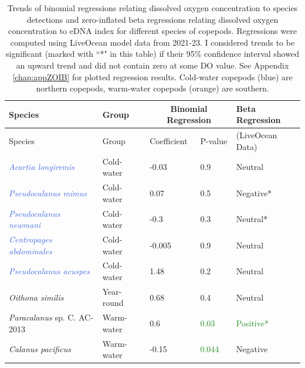 \documentclass[12pt,twoside]{reedthesis}
\begin{document}
	\begin{table}[!h] 
		\begin{tabular}{l | l | l l | l}
			\toprule
			Species & Group & \multicolumn{2}{|c|}{Binomial Regression} & Beta Regression \tabularnewline
			\midrule
			Species &  Group & Coefficient & P-value & (LiveOcean Data)  \\ 
			\midrule 
			\textcolor{RoyalBlue}{\textit{Acartia longiremis}}	& Cold-water & -0.03 & 0.9 & Neutral  \\
			\textcolor{RoyalBlue}{\textit{Pseudocalanus mimus}} & Cold-water & 0.07  & 0.5 & \textcolor{BrickRed}{Negative*}  \\
			\textcolor{RoyalBlue}{\textit{Pseudocalanus newmani}}	& Cold-water & -0.3  & 0.3 &  Neutral* \\
			\textcolor{RoyalBlue}{\textit{Centropages abdominales}} & Cold-water & -0.005 & 0.9 & Neutral   \\
			\textcolor{RoyalBlue}{\textit{Pseudocalanus acuspes}}  & Cold-water & 1.48  & 0.2 & Neutral  \\
			\textit{Oithona similis} & Year-round & 0.68  & 0.4 & Neutral \\
			\textcolor{RedOrange}{\textit{Paracalanus} sp. C. AC-2013} & Warm-water & 0.6  & \textcolor{ForestGreen}{0.03} & \textcolor{ForestGreen}{Positive*}  \\
			\textcolor{RedOrange}{\textit{Calanus pacificus}}	& Warm-water & -0.15  & \textcolor{ForestGreen}{0.044} & \textcolor{BrickRed}{Negative}  \\
			\bottomrule 
		\end{tabular}
		
		\caption[Regression results]{Trends of binomial regressions relating dissolved oxygen concentration to species detections and zero-inflated beta regressions relating dissolved oxygen concentration to eDNA index for different species of copepods. Regressions were computed using LiveOcean model data from 2021-23. I considered trends to be significant (marked with ``*" in this table) if their 95\% confidence interval showed an upward trend and did not contain zero at some DO value. See Appendix \ref{chap:appZOIB} for plotted regression results. Cold-water copepods (blue) are northern copepods, warm-water copepods (orange) are southern.}  \label{Resultstab}
	\end{table}
	
\end{document}
